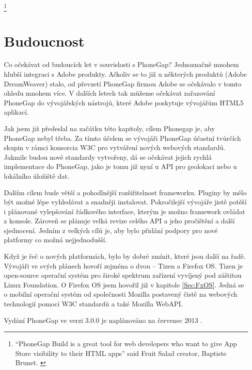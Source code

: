 \textit{} \cite{phonegap_fruit_salad}
\footnote{“PhoneGap Build is a great tool for web developers who want to give App Store visibility to their HTML apps” said Fruit Salad creator, Baptiste Brunet. \cite{phonegap_fruit_salad}} \\


\section{Budoucnost}
Co očekávat od budoucích let v souvislosti s PhoneGap? Jednoznačně mnohem hlubší integraci s Adobe produkty. Ačkoliv se to již u některých produktů (Adobe DreamWeaver) stalo, od převzetí PhoneGap firmou Adobe se očekávalo v tomto ohledu mnohem více. V dalších letech tak můžeme očekávat zařazování PhoneGap do vývojářských nástrojů, které Adobe poskytuje vývojářům HTML5 aplikací.

Jak jsem již předeslal na začátku této kapitoly, cílem Phonegap je, aby PhoneGap nebyl třeba. Za tímto účelem se vývojáři PhoneGap účastní tvůrčích skupin v rámci konsorcia W3C pro vytváření nových webových standardů. Jakmile budou nové standardy vytvořeny, dá se očekávat jejich rychlá implementace do PhoneGap, jako je tomu již nyní u API pro geolokaci nebo u lokálního úložiště dat.

Dalším cílem bude větší a pohodlnější rozšiřitelnost frameworku. Pluginy by mělo být možné lépe vyhledávat a snadněji instalovat. Pokročilejší vývojáře jistě potěší i plánované vylepšování řádkového interface, kterým je možno framework ovládat z konsole. Zároveň se plánuje velká revize celého API a jeho pročištění a další sjednocení. Jedním z velkých cílů je, aby bylo přidání podpory pro nové platformy co možná nejjednodušší.

Když je řeč o nových platformách, bylo by dobré zmínit, které jsou další na řadě. Vývojáři ve svých plánech hovoří zejména o dvou – Tizen a Firefox OS. Tizen je open-source operační systém pro široké spektrum zařízení vyvíjený pod záštitou Linux Foundation. O Firefox OS jsem hovořil již v kapitole \ref{Sec:FxOS}. Jedná se o mobilní operační systém od společnosti Mozilla postavený čistě na webových technologií pomocí W3C standardů a také Mozilla WebAPI.

Vydání PhoneGap ve verzi 3.0.0 je naplánováno na červenec 2013 \cite{cordova_roadmapprojects}.